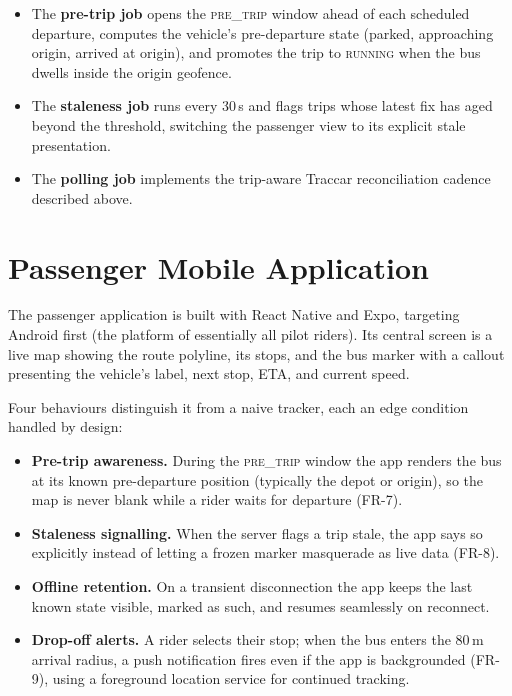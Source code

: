 \begin{itemize}
  \item The \textbf{pre-trip job} opens the \textsc{pre\_trip} window
  ahead of each scheduled departure, computes the vehicle's
  pre-departure state (parked, approaching origin, arrived at origin),
  and promotes the trip to \textsc{running} when the bus dwells inside
  the origin geofence.
  \item The \textbf{staleness job} runs every 30\,s and flags trips whose
  latest fix has aged beyond the threshold, switching the passenger view
  to its explicit stale presentation.
  \item The \textbf{polling job} implements the trip-aware Traccar
  reconciliation cadence described above.
\end{itemize}

\section{Passenger Mobile Application}
\label{sec:impl-passenger}
The passenger application is built with React Native and Expo, targeting
Android first (the platform of essentially all pilot riders). Its
central screen is a live map showing the route polyline, its stops, and
the bus marker with a callout presenting the vehicle's label, next stop,
ETA, and current speed.

Four behaviours distinguish it from a naive tracker, each an edge
condition handled by design:

\begin{itemize}
  \item \textbf{Pre-trip awareness.} During the \textsc{pre\_trip}
  window the app renders the bus at its known pre-departure position
  (typically the depot or origin), so the map is never blank while a
  rider waits for departure (FR-7).
  \item \textbf{Staleness signalling.} When the server flags a trip
  stale, the app says so explicitly instead of letting a frozen marker
  masquerade as live data (FR-8).
  \item \textbf{Offline retention.} On a transient disconnection the app
  keeps the last known state visible, marked as such, and resumes
  seamlessly on reconnect.
  \item \textbf{Drop-off alerts.} A rider selects their stop; when the
  bus enters the 80\,m arrival radius, a push notification fires even if
  the app is backgrounded (FR-9), using a foreground location service
  for continued tracking.
\end{itemize}

